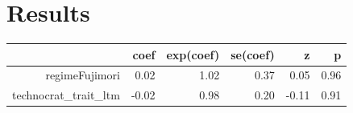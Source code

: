 \documentclass[a4paper, 12pt]{article}
\begin{document}
\section{Results}

\begin{table}[ht]
\centering
\begin{tabular}{rrrrrr}
  \hline
 & coef & exp(coef) & se(coef) & z & p \\ 
  \hline
regimeFujimori & 0.02 & 1.02 & 0.37 & 0.05 & 0.96 \\ 
  technocrat\_trait\_ltm & -0.02 & 0.98 & 0.20 & -0.11 & 0.91 \\ 
   \hline
\end{tabular}
\end{table}
\end{document}
